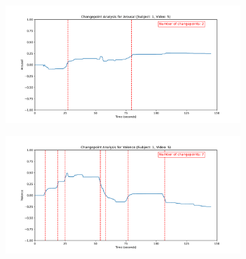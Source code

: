 \documentclass[11pt, letterpaper]{article}
\begin{document}
\begin{figure} \ContinuedFloat
        \centering
    \begin{subfigure}[t]{0.49\textwidth}
        \centering
        \includegraphics[width=\linewidth]{sub_1_changepoints_V5_arousal} 
        \caption{} \label{fig:sub_1_changepoints_V5_arousal}
    \end{subfigure}
    \hfill
    \begin{subfigure}[t]{0.49\textwidth}
        \centering
        \includegraphics[width=\linewidth]{sub_1_changepoints_V5_valence} 
        \caption{} \label{fig:sub_1_changepoints_V5_valence}
    \end{subfigure}

    \vspace{1cm}
    

\end{figure}
\end{document}

